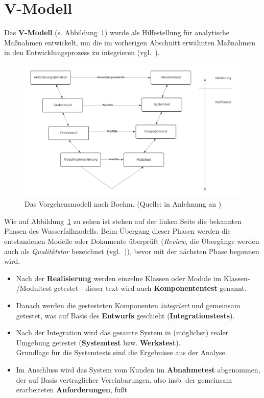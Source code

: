 \section{V-Modell}\label{sec:v-modell}
Das \textbf{V-Modell} (s. Abbildung~\ref{fig:v-modell}) wurde als Hilfestellung für analytische Maßnahmen entwickelt, um die im vorherigen Abschnitt erwähnten Maßnahmen in den Entwicklungsprozess zu integrieren (vgl.~\cite[10]{Wed09c}).

\begin{figure}
    \centering
    \includegraphics[scale=0.3]{chapters/Glossar/img/vmodell}
    \caption{Das Vorgehensmodell nach Boehm. (Quelle: in Anlehnung an \cite[554, Abb. 20.11-2]{Bal08})}
    \label{fig:v-modell}
\end{figure}

\noindent
Wie auf Abbildung~\ref{fig:v-modell} zu sehen ist stehen auf der linken Seite die bekannten Phasen des Wasserfallmodells.
Beim Übergang dieser Phasen werden die entstandenen Modelle oder Dokumente überprüft (\textit{Review}, die Übergänge werden auch als \textit{Qualitätstor} bezeichnet (vgl.~\cite[11]{Wed09c})), bevor mit der nächsten Phase begonnen wird.

\begin{itemize}
    \item Nach der \textbf{Realisierung} werden einzelne Klassen oder Module im Klassen- /Modultest getestet - dieser text wird auch \textbf{Komponententest} genannt.
    \item Danach werden die gestesteten Komponenten \textit{integriert} und gemeinsam getestet, was auf Basis des \textbf{Entwurfs} geschieht (\textbf{Integrationstests}).
    \item Nach der Integration wird das gesamte System in (möglichst) realer Umgebung getestet (\textbf{Systemtest} bzw. \textbf{Werkstest}).\\
    Grundlage für die Systemtests sind die Ergebnisse aus der Analyse.
    \item Im Anschluss wird das System  vom Kunden im \textbf{Abnahmetest} abgenommen, der auf Basis vertraglicher Vereinbarungen, also insb. der gemeinsam erarbeiteten \textbf{Anforderungen}, fußt
\end{itemize}

